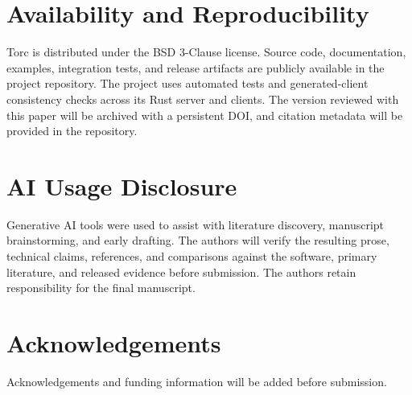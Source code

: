 \documentclass[11pt]{article}
\begin{document}
\section{Availability and Reproducibility}

Torc is distributed under the BSD 3-Clause license. Source code, documentation, examples,
integration tests, and release artifacts are publicly available in the project repository. The
project uses automated tests and generated-client consistency checks across its Rust server and
clients. The version reviewed with this paper will be archived with a persistent DOI, and citation
metadata will be provided in the repository.


\section{AI Usage Disclosure}

Generative AI tools were used to assist with literature discovery, manuscript brainstorming, and
early drafting. The authors will verify the resulting prose, technical claims, references, and
comparisons against the software, primary literature, and released evidence before submission. The
authors retain responsibility for the final manuscript.

\section*{Acknowledgements}

Acknowledgements and funding information will be added before submission.



\end{document}
